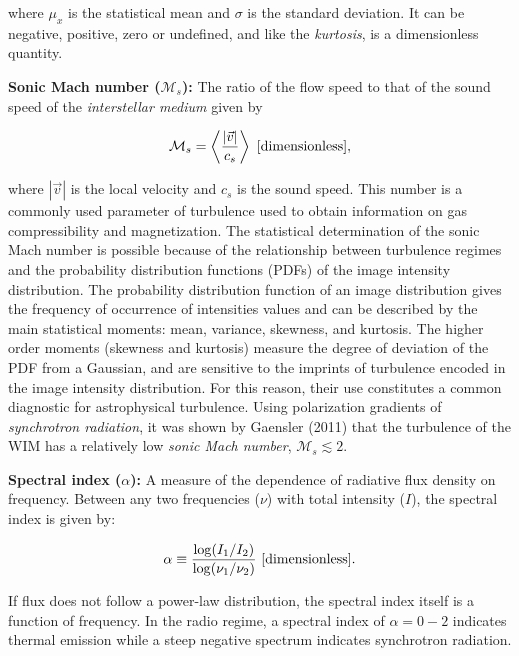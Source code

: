\documentclass[a4paper,10pt]{article}
\begin{document}
{\noindent}where $\mu_x$ is the statistical mean and $\sigma$ is the standard deviation. It can be negative, positive, zero or undefined, and like the \textit{kurtosis}, is a dimensionless quantity.

{\noindent}\textbf{Sonic Mach number ($\mathcal{M}_s$):} The ratio of the flow speed to that of the sound speed of the \textit{interstellar medium} given by

\begin{align*}
    \mathcal{M}_s = \left\langle\frac{\lvert\vec{v}\rvert}{c_s}\right\rangle ~ [{\rm dimensionless}],
\end{align*}

{\noindent}where $|\vec{v}|$ is the local velocity and $c_s$ is the sound speed. This number is a commonly used parameter of turbulence used to obtain information on gas compressibility and magnetization. The statistical determination of the sonic Mach number is possible because of the relationship between turbulence regimes and the probability distribution functions (PDFs) of the image intensity distribution. The probability distribution function of an image distribution gives the frequency of occurrence of intensities values and can be described by the main statistical moments: mean, variance, skewness, and kurtosis. The higher order moments (skewness and kurtosis) measure the degree of deviation of the PDF from a Gaussian, and are sensitive to the imprints of turbulence encoded in the image intensity distribution. For this reason, their use constitutes a common diagnostic for astrophysical turbulence. Using polarization gradients of \textit{synchrotron radiation}, it was shown by Gaensler (2011) that the turbulence of the WIM has a relatively low \textit{sonic Mach number}, $\mathcal{M}_s\lesssim2$.

{\noindent}\textbf{Spectral index ($\alpha$):} A measure of the dependence of radiative flux density on frequency. Between any two frequencies ($\nu$) with total intensity ($I$), the spectral index is given by:

\begin{align*}
    \alpha \equiv \frac{\log(I_1/I_2)}{\log(\nu_1/\nu_2)} ~ [{\rm dimensionless}].
\end{align*}

{\noindent}If flux does not follow a power-law distribution, the spectral index itself is a function of frequency. In the radio regime, a spectral index of $\alpha=0-2$ indicates thermal emission while a steep negative spectrum indicates synchrotron radiation.
\end{document}
